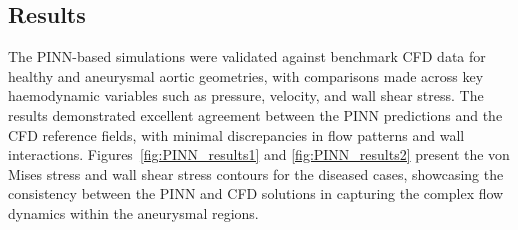 \documentclass[12pt, a4paper]{article}
\begin{document}
\subsection{Results}
\label{sec:PINN_Results}

The PINN-based simulations were validated against benchmark CFD data for healthy and aneurysmal aortic geometries, with comparisons made across key haemodynamic variables such as pressure, velocity, and wall shear stress. The results demonstrated excellent agreement between the PINN predictions and the CFD reference fields, with minimal discrepancies in flow patterns and wall interactions. Figures~\ref{fig:PINN_results1} and \ref{fig:PINN_results2} present the von Mises stress and wall shear stress contours for the diseased cases, showcasing the consistency between the PINN and CFD solutions in capturing the complex flow dynamics within the aneurysmal regions.
\end{document}
